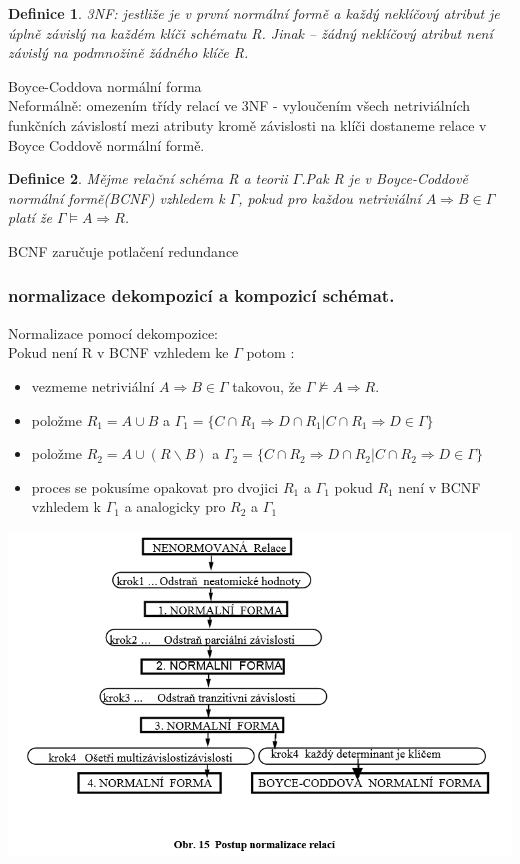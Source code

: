\documentclass[10pt,a4paper]{article}
\newtheorem{definition}{Definice}
\begin{document}
\begin{definition}
3NF: jestliže je v první normální formě a každý neklíčový atribut je úplně závislý na každém klíči schématu R. 
Jinak – žádný neklíčový atribut není závislý na podmnožině žádného klíče R.
\end{definition}

Boyce-Coddova normální forma\\
Neformálně:
omezením třídy relací ve 3NF - vyloučením všech netriviálních funkčních závislostí mezi atributy kromě závislosti na klíči 
dostaneme relace v Boyce Coddově normální formě.

\begin{definition}
Mějme relační schéma R a teorii $\Gamma$.Pak R je v Boyce-Coddově normální formě(BCNF) vzhledem k $\Gamma$,
pokud pro každou netriviální $A \Rightarrow B \in \Gamma$ platí že $ \Gamma \models A \Rightarrow R$.
\end{definition}
BCNF zaručuje potlačení redundance

\subsubsection{normalizace dekompozicí a kompozicí schémat.}
Normalizace pomocí dekompozice:\\
Pokud není R v BCNF vzhledem ke $\Gamma$ potom :
\begin{itemize}
\item vezmeme netriviální $A \Rightarrow B \in \Gamma$ takovou, že $ \Gamma \not\models A \Rightarrow R$.
\item položme $R_1 = A \cup B$ a $\Gamma_1 = \{C \cap R_1 \Rightarrow D \cap R_1 | C \cap R_1 \Rightarrow D \in \Gamma \}$
\item položme $R_2 = A \cup (R \backslash B)$ a $\Gamma_2 = \{C \cap R_2 \Rightarrow D \cap R_2 | C \cap R_2 \Rightarrow D \in \Gamma \}$
\item proces se pokusíme opakovat pro dvojici $R_1$ a $\Gamma_1$ pokud $R_1$ není v BCNF vzhledem k $\Gamma_1$ a analogicky pro $R_2$ a $\Gamma_1$
\end{itemize}

\includegraphics[scale=0.65]{img/sesty_odstavec/normovani.png}\\	
\end{document}
